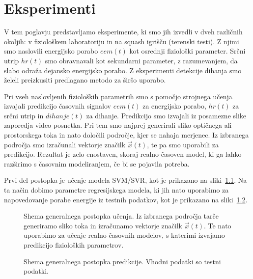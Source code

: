 \chapter{Eksperimenti}\label{sec:eksperimenti}
V tem poglavju predstavljamo eksperimente, ki smo jih izvedli v dveh različnih okoljih: v fiziološkem laboratoriju in na squash igrišču (terenski testi). Z njimi smo naslovili energijsko porabo $eem(t)$ kot osrednji fiziološki parameter. Srčni utrip $hr(t)$ smo obravnavali kot sekundarni parameter, z razumevanjem, da slabo odraža dejansko energijsko porabo. Z eksperimenti detekcije dihanja smo želeli preizkusiti predlagano metodo za širšo uporabo.

Pri vseh naslovljenih fizioloških parametrih smo s pomočjo strojnega učenja izvajali predikcijo časovnih signalov $eem(t)$ za energijsko porabo, $hr(t)$ za srčni utrip in $dihanje(t)$ za dihanje. Predikcijo smo izvajali iz posamezne slike zaporedja video posnetka. Pri tem smo najprej generirali sliko optičnega ali prostorskega toka in nato določili področje, kjer se nahaja merjenec. Iz izbranega področja smo izračunali vektorje značilk $\vec{x}(t)$, te pa smo uporabili za predikcijo. Rezultat je zelo enostaven, skoraj realno-časoven model, ki ga lahko razširimo s časovnim modeliranjem, če bi se pojavila potreba. 

Prvi del postopka je učenje modela SVM/SVR, kot je prikazano na sliki~\ref{fig:shema-generalnega-postopka01}. Na ta način dobimo parametre regresijskega modela, ki jih nato uporabimo za napovedovanje porabe energije iz testnih podatkov, kot je prikazano na sliki~\ref{fig:shema-generalnega-postopka02}.

\begin{figure}[!htb]
	\centering
	\resizebox{\columnwidth}{!}{}
	\caption[Shema generalnega postopka učenja]{Shema generalnega postopka učenja. Iz izbranega področja tarče generiramo sliko toka in izračunamo vektorje značilk $\vec{x}(t)$. Te nato uporabimo za učenje realno-časovnih modelov, s katerimi izvajamo predikcijo fizioloških parametrov.}
	\label{fig:shema-generalnega-postopka01}
\end{figure}

\begin{figure}[!htb]
	\centering
	\resizebox{\columnwidth}{!}{}
	\caption[Shema generalnega postopka predikcije]{Shema generalnega postopka predikcije. Vhodni podatki so testni podatki.}
	\label{fig:shema-generalnega-postopka02}
\end{figure}

